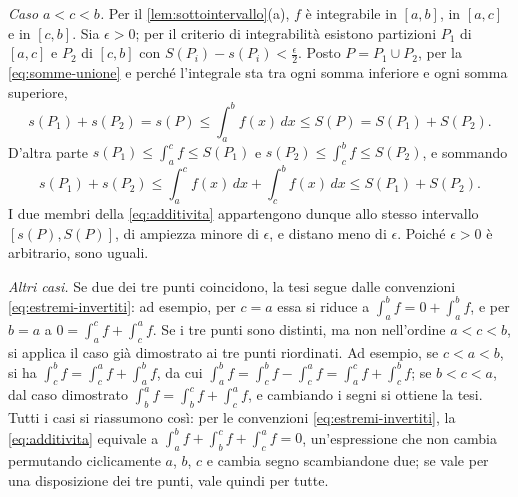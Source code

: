 \begin{dimostrazione}
\emph{Caso $a<c<b$.} Per il \cref{lem:sottointervallo}(a), $f$ è integrabile in
$[a,b]$, in $[a,c]$ e in $[c,b]$. Sia $\epsilon>0$; per il criterio di integrabilità
esistono partizioni $P_{1}$ di $[a,c]$ e $P_{2}$ di $[c,b]$ con
$S(P_{i})-s(P_{i})<\frac\epsilon2$. Posto $P=P_{1}\cup P_{2}$, per la
\eqref{eq:somme-unione} e perché l'integrale sta tra ogni somma inferiore e ogni somma
superiore,
\[
  s(P_{1})+s(P_{2})=s(P)\le\int_{a}^{b}f(x)\,dx\le S(P)=S(P_{1})+S(P_{2}) .
\]
D'altra parte $s(P_{1})\le\int_{a}^{c}f\le S(P_{1})$ e $s(P_{2})\le\int_{c}^{b}f\le S(P_{2})$,
e sommando
\[
  s(P_{1})+s(P_{2})\le\int_{a}^{c}f(x)\,dx+\int_{c}^{b}f(x)\,dx\le S(P_{1})+S(P_{2}) .
\]
I due membri della \eqref{eq:additivita} appartengono dunque allo stesso intervallo
$[s(P),S(P)]$, di ampiezza minore di $\epsilon$, e distano meno di $\epsilon$. Poiché
$\epsilon>0$ è arbitrario, sono uguali.

\emph{Altri casi.} Se due dei tre punti coincidono, la tesi segue dalle convenzioni
\eqref{eq:estremi-invertiti}: ad esempio, per $c=a$ essa si riduce a
$\int_{a}^{b}f=0+\int_{a}^{b}f$, e per $b=a$ a $0=\int_{a}^{c}f+\int_{c}^{a}f$. Se i tre
punti sono distinti, ma non nell'ordine $a<c<b$, si applica il caso già dimostrato
ai tre punti riordinati. Ad esempio, se $c<a<b$, si ha
$\int_{c}^{b}f=\int_{c}^{a}f+\int_{a}^{b}f$, da cui
$\int_{a}^{b}f=\int_{c}^{b}f-\int_{c}^{a}f=\int_{a}^{c}f+\int_{c}^{b}f$; se $b<c<a$, dal
caso dimostrato $\int_{b}^{a}f=\int_{b}^{c}f+\int_{c}^{a}f$, e cambiando i segni si ottiene la
tesi. Tutti i casi si riassumono così: per le convenzioni
\eqref{eq:estremi-invertiti}, la \eqref{eq:additivita} equivale a
$\int_{a}^{b}f+\int_{b}^{c}f+\int_{c}^{a}f=0$, un'espressione che non cambia permutando
ciclicamente $a$, $b$, $c$ e cambia segno scambiandone due; se vale per una
disposizione dei tre punti, vale quindi per tutte.
\end{dimostrazione}

